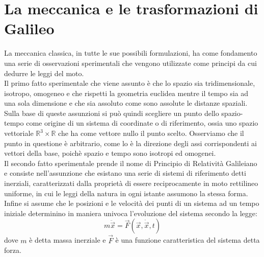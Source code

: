 \section{La meccanica e le trasformazioni di Galileo}
La meccanica classica, in tutte le sue possibili formulazioni, ha come fondamento una serie 
di osservazioni sperimentali che vengono utilizzate come principi da cui dedurre le leggi del moto.\\

Il primo fatto sperimentale che viene assunto è che lo spazio sia tridimensionale, isotropo, omogeneo e che rispetti la 
geometria euclidea mentre il tempo sia ad una sola dimensione e che sia assoluto come sono assolute le distanze spaziali.\\
Sulla base di queste assunzioni si può quindi scegliere un punto dello spazio-tempo come 
origine di un sistema di coordinate o di riferimento, ossia uno spazio vettoriale 
$\mathbb{R}^3\times\mathbb{R}$ che ha come vettore nullo il punto scelto. Osserviamo che il punto 
in questione è arbitrario, come lo è la direzione degli assi corrispondenti ai vettori della base, poichè spazio e tempo sono isotropi 
ed omogenei.\\

Il secondo fatto sperimentale prende il nome di Principio di Relatività Galileiano e consiste 
nell'assunzione che esistano una serie di sistemi di riferimento detti inerziali, caratterizzati 
dalla proprietà di essere reciprocamente in moto rettilineo uniforme, in cui le leggi della natura 
in ogni istante assumono la stessa forma.\\

Infine si assume che le posizioni e le velocità dei punti di un sistema ad un tempo iniziale determinino 
in maniera univoca l'evoluzione del sistema secondo la legge:
\begin{equation}
	m\ddot{\vec{x}}=\vec{F}(\vec{x},\dot{\vec{x}},t)
	\label{equazioneDiNewton}
\end{equation}
dove $m$ è detta massa inerziale e $\vec{F}$ è una funzione caratteristica del sistema detta forza.\\

